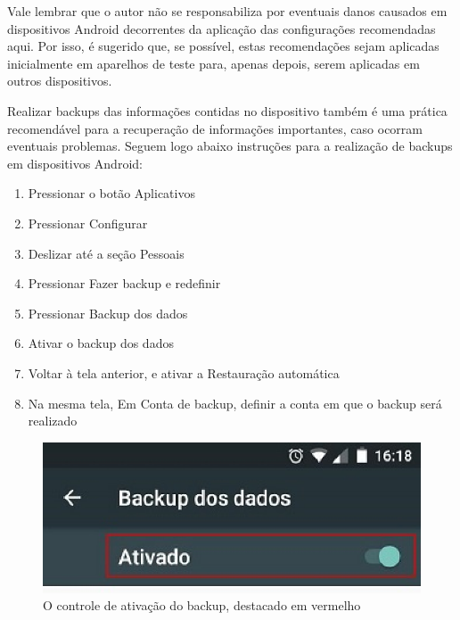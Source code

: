 Vale lembrar que o autor n\~ao se responsabiliza por eventuais danos causados em dispositivos Android decorrentes da aplica\c c\~ao das configura\c c\~oes recomendadas aqui. Por isso, \'e sugerido que, se poss\'ivel, estas recomenda\c c\~oes sejam aplicadas inicialmente em aparelhos de teste para, apenas depois, serem aplicadas em outros dispositivos. 

Realizar backups das informa\c c\~oes contidas no dispositivo tamb\'em \'e uma pr\'atica recomend\'avel para a recupera\c c\~ao de informa\c c\~oes importantes, caso ocorram eventuais problemas. Seguem logo abaixo instru\c c\~oes para a realiza\c c\~ao de backups em dispositivos Android:

\begin{enumerate}
\item Pressionar o bot\~ao Aplicativos
\item Pressionar Configurar
\item Deslizar at\'e a se\c c\~ao Pessoais
\item Pressionar Fazer backup e redefinir
\item Pressionar Backup dos dados 
\item Ativar o backup dos dados
\item Voltar \`a tela anterior, e ativar a Restaura\c c\~ao autom\'atica
\item Na mesma tela, Em Conta de backup, definir a conta em que o backup ser\'a realizado   
\end{enumerate}

\begin{figure}[h]
	\centering
	\includegraphics{imagem3.eps}
	\caption{O controle de ativa\c c\~ao do backup, destacado em vermelho}
\end{figure}


